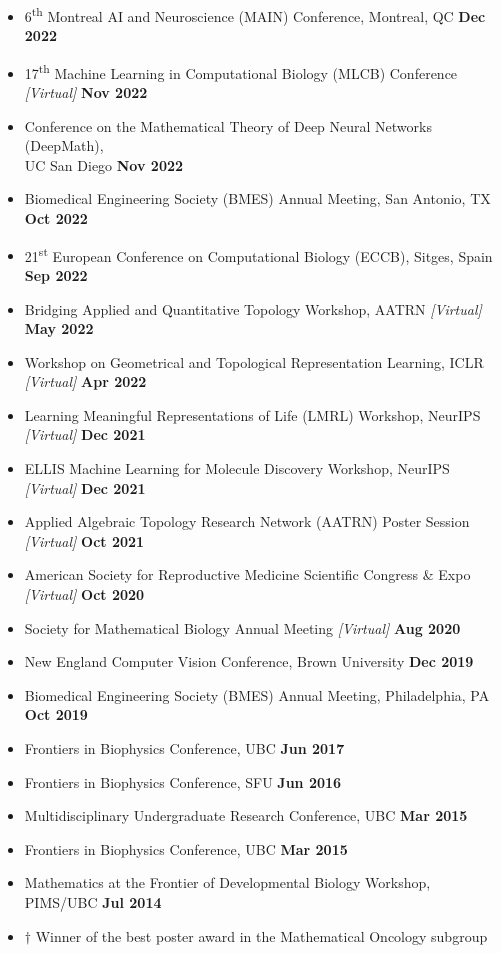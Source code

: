 \documentclass[margin,line]{res}
\begin{document}
\begin{resume}
{\begin{itemize}
\item[] 6\textsuperscript{th} Montreal AI and Neuroscience (MAIN) Conference, Montreal, QC \hfill {\bf Dec 2022}
\item[] 17\textsuperscript{th} Machine Learning in Computational Biology (MLCB) Conference \textit{[Virtual]} \hfill {\bf Nov 2022}
\item[] Conference on the Mathematical Theory of Deep Neural Networks (DeepMath), \\ UC San Diego \hfill {\bf Nov 2022}
\item[] Biomedical Engineering Society (BMES) Annual Meeting, San Antonio, TX \hfill {\bf Oct 2022}
\item[] 21\textsuperscript{st} European Conference on Computational Biology (ECCB), Sitges, Spain \hfill {\bf Sep 2022}
\item[] Bridging Applied and Quantitative Topology Workshop, AATRN \textit{[Virtual]} \hfill {\bf May 2022}
\item[] Workshop on Geometrical and Topological Representation Learning, ICLR \textit{[Virtual]} \hfill {\bf Apr 2022} 
\item[] Learning Meaningful Representations of Life (LMRL) Workshop, NeurIPS \textit{[Virtual]} \hfill {\bf Dec 2021}
\item[] ELLIS Machine Learning for Molecule Discovery Workshop, NeurIPS \textit{[Virtual]} \hfill {\bf Dec 2021}
\item[] Applied Algebraic Topology Research Network (AATRN) Poster Session \textit{[Virtual]} \hfill {\bf Oct 2021}
\item[] American Society for Reproductive Medicine Scientific Congress \& Expo \textit{[Virtual]} \hfill {\bf Oct 2020}
\item[] Society for Mathematical Biology Annual Meeting\textsuperscript{\textdagger} \textit{[Virtual]} \hfill {\bf Aug 2020}
\item[] New England Computer Vision Conference, Brown University \hfill {\bf Dec 2019}
\item[] Biomedical Engineering Society (BMES) Annual Meeting, Philadelphia, PA \hfill {\bf Oct 2019}
\item[] Frontiers in Biophysics Conference, UBC \hfill {\bf Jun 2017}
\item[] Frontiers in Biophysics Conference, SFU \hfill {\bf Jun 2016}
\item[] Multidisciplinary Undergraduate Research Conference, UBC \hfill {\bf Mar 2015}
\item[] Frontiers in Biophysics Conference, UBC \hfill {\bf Mar 2015}
\item[] Mathematics at the Frontier of Developmental Biology Workshop, PIMS/UBC \hfill {\bf Jul 2014}
\item[] $\dagger$ Winner of the best poster award in the Mathematical Oncology subgroup


\end{itemize}}
\end{resume}
\end{document}
